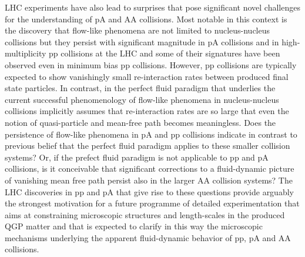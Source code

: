 \documentclass[../report.tex]{subfiles}
\begin{document}
LHC experiments have also lead to surprises that pose significant novel challenges for the understanding of pA and AA collisions. Most notable in this context is the discovery that flow-like phenomena are not limited to nucleus-nucleus collisions but they persist with significant magnitude in pA collisions and in high-multiplicity pp collisions at the LHC and some of their signatures have been observed even in minimum bias pp collisions. However, pp collisions are typically expected to show vanishingly small re-interaction rates between produced final state particles. In contrast, in the perfect fluid paradigm that underlies the current successful phenomenology of flow-like phenomena in nucleus-nucleus collisions implicitly assumes that re-interaction rates are so large that even the notion of quasi-particle and mean-free path becomes meaningless. Does the persistence of flow-like phenomena in pA and pp collisions indicate in contrast to previous belief that the perfect fluid paradigm applies to these smaller collision systems? Or, if the prefect fluid paradigm is not applicable to pp and pA collisions, is it conceivable that significant corrections to a fluid-dynamic picture of vanishing mean free path persist also in the larger AA collision systems? The LHC discoveries in pp and pA that give rise to these questions provide arguably the strongest motivation for a future programme of detailed experimentation that aims at constraining microscopic structures and length-scales in the produced QGP matter and that is expected to clarify in this way the microscopic mechanisms underlying the apparent fluid-dynamic behavior of pp, pA and AA collisions.   
\end{document}
